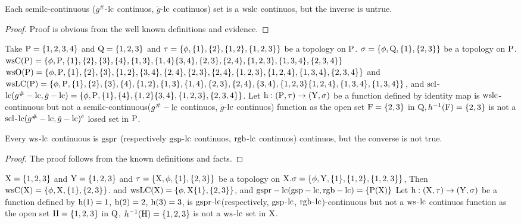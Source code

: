 \begin{thm}\label{thm6.3.7}
Each semilc-continuous ($g^{\text{\#}}$-$\mathrm{lc}$ continuos, $\ddot{g}$-$\mathrm{lc}$ continuos) set is a $\mathrm{ws}\mathrm{lc}$ continuos, but the inverse is untrue.
\end{thm}

\begin{proof}
Proof is obvious from the well known definitions and evidence.
\end{proof}

\begin{exm}\label{exam6.3.8}
Take $\mathrm{P} = \{1,2,3,4\}$ and $\mathrm{Q}= \{1,2,3\}$ and $\tau = \{\phi, \{1\},\{2\}, \{1,2\},\break \{1,2,3\}\}$ be a topology on $\mathrm{P}$. $\sigma = \{\phi, \mathrm{Q}, \{1\},\{ 2, 3\}\}$ be a topology on $\mathrm{P}$. $\mathrm{ws}\mathrm{C}(\mathrm{P}) = \{\phi, \mathrm{P},\{1\}, \{2\}, \{3\}, \{4\},\{1,3\}, \{1, 4\} \{3,4\}, \{2,3\}, \{2,4\}, \{1,2, 3\},\{1,3,4\},\{2,3,4\}\}$\break $\ws\TSO(\TSP) = \{\phi, \TSP, \{1\}, \{2\}, \{3\},\{1,2\},\{3,4\}, \{2,4\}, \{2,3\}, \{2,4\}, \{1,2,3\}, \{1,2,4\},\break \{1,3,4\},\{2,3,4\}\}$ and $\ws\LC(\TSP)= \{\phi, \TSP ,\{1\}, \{2\},\{3\},\{4\},\{1,2\},\{1,3\}, \{1,4\},\break \{2,3\}, \{2,4\},\{3,4\}, \{1,2,3\}\{1,2,4\},\{1,3,4\},\{1,3,4\}\}$, and $\mathrm{scl}$-$\mathrm{lc}(g^{\text{\#}}-\mathrm{lc}, \ddot{g}-\mathrm{lc}) = \{\phi, \mathrm{P},\{1\},\{4\},\{1,2\}\{3, 4\},\{1,2,3\},\{2,3,4\}\}$. Let $\mathrm{h}: (\mathrm{P}, \tau )\to(\mathrm{Y}, \sigma)$ be a function defined by identity map is $\mathrm{ws}\mathrm{lc}$-continuous but not a semilc-continuous($g^{\text{\#}} -\mathrm{lc}$ continuos, $\ddot{g}$-$\mathrm{lc}$ continuos) function as the open set $\mathrm{F}=\{2,3\}$ in $\mathrm{Q}, h^{-1} (\mathrm{F})=\{2,3\}$ is not a $\mathrm{scl}$-$\mathrm{lc}(g^{\text{\#}} -\mathrm{lc}, \ddot{g} -\mathrm{lc})^{\text{c}}$ losed set in $\mathrm{P}$.
\end{exm}

\begin{thm}\label{thm6.3.9}
Every $\mathrm{ws}$-$\mathrm{lc}$ continuous is $\mathrm{gspr}$ (respectively $\mathrm{gsp}$-$\mathrm{lc}$ continuos, $\mathrm{rgb}$-$\mathrm{lc}$ continuos) continuos, but the converse is not true.
\end{thm}

\begin{proof}
The proof follows from the known definitions and facts.
\end{proof}

\begin{exm}\label{exam6.3.10}
$\mathrm{X} = \{1, 2, 3\}$ and $\mathrm{Y}= \{1, 2, 3\}$ and $\tau = \{\mathrm{X}, \phi, \{1\}, \{2, 3\}\}$ be a topology on $\mathrm{X}. \sigma = \{\phi, \mathrm{Y}, \{1\}, \{1, 2\}, \{1, 2, 3\}\}$, Then $\mathrm{ws}\mathrm{C}(\mathrm{X}) = \{\phi, \mathrm{X}, \{1\}, \{2, 3\}\}$. and $\mathrm{ws}\mathrm{LC}(\mathrm{X})= \{\phi, \mathrm{X} \{1\}, \{2, 3\}\}$, and $\mathrm{gspr} - \mathrm{lc}(\mathrm{gsp}-\mathrm{lc}, \mathrm{rgb}-\mathrm{lc}) = \{\mathrm{P}(\mathrm{X})\}$ Let $\mathrm{h}: (\mathrm{X}, \tau)\to(\mathrm{Y}, \sigma)$ be a function defined by $\mathrm{h}(1)= 1$, $\mathrm{h}(2)=2$, $\mathrm{h}(3)=3$, is $\mathrm{gspr}$-$\mathrm{lc}$(respectively, $\mathrm{gsp}$-$\mathrm{lc}$, $\mathrm{rgb}$-$\mathrm{lc}$)-continuous but not a $\mathrm{ws}$-$\mathrm{lc}$ continuos function as the open set $\mathrm{H}=\{1,2,3\}$ in $\mathrm{Q}$, $h^{-1}(\mathrm{H})=\{1,2,3\}$ is not a $\mathrm{ws}$-$\mathrm{lc}$ set in $\mathrm{X}$.
\end{exm}

